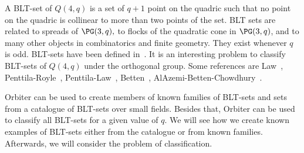 A BLT-set of $Q(4,q)$ is a set of $q+1$ point on the quadric 
such that no point on the quadric is collinear to more than two points of the set. 
BLT sets are related to spreads of $\PG(3,q),$ to flocks 
of the quadratic cone in $\PG(3,q)$, and to many other objects in combinatorics and finite geometry.
They exist whenever $q$ is odd. 
BLT-sets have been defined in~\cite{BaderLunardonThas90}.
It is an interesting problem to classify BLT-sets of $Q(4,q)$ under the orthogonal group.
Some references are 
Law~\cite{Law03}, Penttila-Royle~\cite{PenttilaRoyle98}, 
Penttila-Law~\cite{LawPenttila03,LawPenttila04}, 
Betten~\cite{Betten13}, AlAzemi-Betten-Chowdhury~\cite{AlAzemiBettenChowdhury18}.

\bigskip


Orbiter can be used to create members of known families of BLT-sets 
and sets from a catalogue of BLT-sets over small fields. 
Besides that, 
Orbiter can be used to classify all BLT-sets for a given value of $q$. 
We will see how we create known examples of BLT-sets either from the catalogue or from known families. 
Afterwards, we will consider the problem of classification.


\bigskip

